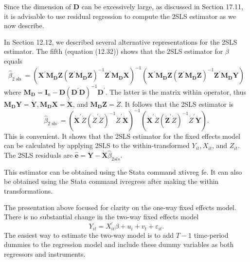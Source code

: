 \documentclass[10pt]{article}
\begin{document}
Since the dimension of $\boldsymbol{D}$ can be excessively large, as discussed in Section 17.11, it is advisable to use residual regression to compute the 2SLS estimator as we now describe.

In Section 12.12, we described several alternative representations for the 2SLS estimator. The fifth (equation (12.32)) shows that the 2SLS estimator for $\beta$ equals
$$
\widehat{\beta}_{2 \text { sls }}=\left(\boldsymbol{X}^{\prime} \boldsymbol{M}_{\boldsymbol{D}} \boldsymbol{Z}\left(\boldsymbol{Z}^{\prime} \boldsymbol{M}_{\boldsymbol{D}} \boldsymbol{Z}\right)^{-1} \boldsymbol{Z}^{\prime} \boldsymbol{M}_{\boldsymbol{D}} \boldsymbol{X}\right)^{-1}\left(\boldsymbol{X}^{\prime} \boldsymbol{M}_{\boldsymbol{D}} \boldsymbol{Z}\left(\boldsymbol{Z}^{\prime} \boldsymbol{M}_{\boldsymbol{D}} \boldsymbol{Z}\right)^{-1} \boldsymbol{Z}^{\prime} \boldsymbol{M}_{\boldsymbol{D}} \boldsymbol{Y}\right)
$$
where $\boldsymbol{M}_{\boldsymbol{D}}=\boldsymbol{I}_{n}-\boldsymbol{D}\left(\boldsymbol{D}^{\prime} \boldsymbol{D}\right)^{-1} \boldsymbol{D}^{\prime}$. The latter is the matrix within operator, thus $\boldsymbol{M}_{\boldsymbol{D}} \boldsymbol{Y}=\dot{\boldsymbol{Y}}, \boldsymbol{M}_{\boldsymbol{D}} \boldsymbol{X}=\dot{\boldsymbol{X}}$, and $\boldsymbol{M}_{\boldsymbol{D}} \boldsymbol{Z}=\dot{Z}$. It follows that the 2SLS estimator is
$$
\widehat{\beta}_{2 \text { sls }}=\left(\dot{\boldsymbol{X}}^{\prime} \dot{Z}\left(\dot{Z}^{\prime} \dot{Z}\right)^{-1} \dot{Z}^{\prime} \dot{\boldsymbol{X}}\right)^{-1}\left(\dot{\boldsymbol{X}}^{\prime} \dot{Z}\left(\dot{\boldsymbol{Z}}^{\prime} \dot{Z}\right)^{-1} \dot{Z}^{\prime} \dot{\boldsymbol{Y}}\right) .
$$
This is convenient. It shows that the 2SLS estimator for the fixed effects model can be calculated by applying 2SLS to the within-transformed $Y_{i t}, X_{i t}$, and $Z_{i t}$. The 2SLS residuals are $\widehat{\boldsymbol{e}}=\dot{\boldsymbol{Y}}-\dot{\boldsymbol{X}} \widehat{\beta}_{2 s l s}$.

This estimator can be obtained using the Stata command xtivreg fe. It can also be obtained using the Stata command ivregress after making the within transformations.

The presentation above focused for clarity on the one-way fixed effects model. There is no substantial change in the two-way fixed effects model
$$
Y_{i t}=X_{i t}^{\prime} \beta+u_{i}+v_{t}+\varepsilon_{i t} .
$$
The easiest way to estimate the two-way model is to add $T-1$ time-period dummies to the regression model and include these dummy variables as both regressors and instruments.
\end{document}

